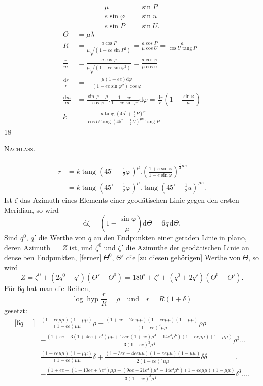 \[
\begin{aligned}
\mu&=\sin P\\
e\sin\varphi&=\sin u\\
e\sin P&=\sin U.
\end{aligned}
\]
\[
\begin{aligned}
\Theta&=\mu\lambda\\[4pt]
R&=\frac{a\cos P}{\mu\sqrt{(1-ee\sin P^2)}}=\frac{a\cos P}{\mu\cos U}=\frac{a}{\cos U\operatorname{tang}P}\\[5pt]
\frac rm&=\frac{a\cos\varphi}{\mu\sqrt{(1-ee\sin\varphi^2)}}=\frac{a\cos\varphi}{\mu\cos u}\\[5pt]
\frac{\mathrm dr}{r}&=-\frac{\mu(1-ee)\mathrm d\varphi}{(1-ee\sin\varphi^2)\cos\varphi}\\[5pt]
\frac{\mathrm dm}{m}&=\frac{\sin\varphi-\mu}{\cos\varphi}.\frac{1-ee}{1-ee\sin\varphi^2}\mathrm d\varphi=\frac{\mathrm dr}{r}\left(1-\frac{\sin\varphi}{\mu}\right)\\[5pt]
k&=\frac{a\operatorname{tang}(45^\circ+\frac12P)^\mu}{\cos U\operatorname{tang}(45^\circ+\frac12U)^{\mu e}\operatorname{tang}P}
\end{aligned}
\]
\vfill{}\hfill18\hspace*{2cm}\par
\clearpage
{}\hfill\textsc{Nachlass.}\hfill\mbox{}\par\medskip
\[
\begin{aligned}
r&=k\operatorname{tang}(45^\circ-\tfrac12\varphi)^\mu.\left(\frac{1+e\sin\varphi}{1-e\sin\varphi}\right)^{\frac12\mu e}\\
&=k\operatorname{tang}(45^\circ-\tfrac12\varphi)^\mu.\operatorname{tang}(45^\circ+\tfrac12u)^{\mu e}.
\end{aligned}
\]
Ist $\zeta$ das Azimuth eines Elements einer geodätischen Linie gegen den ersten Meridian, so wird
\[
\mathrm d\zeta=\left(1-\frac{\sin\varphi}{\mu}\right)\mathrm d\Theta=6q\,\mathrm d\Theta.
\]
Sind $q^0$, $q'$ die Werthe von $q$ an den Endpunkten einer geraden Linie in plano, deren Azimuth $=Z$ ist, und $\zeta^0$ und $\zeta'$ die Azimuthe der geodätischen Linie an denselben Endpunkten, [ferner] $\Theta^0$, $\Theta'$ die [zu diesen gehörigen] Werthe von $\Theta$, so wird
\[
Z=\zeta^0+(2q^0+q')(\Theta'-\Theta^0)=180^\circ+\zeta'+(q^0+2q')(\Theta^0-\Theta').
\]
Für $6q$ hat man die Reihen,
\[
\log\operatorname{hyp}\frac rR=\rho\quad\text{und}\quad r=R(1+\delta)
\]
gesetzt:
\begingroup\footnotesize
\[
\begin{aligned}
{[}6q={]}&\frac{(1-ee\mu\mu)(1-\mu\mu)}{(1-ee)\mu\mu}\rho+\frac{(1+ee-2ee\mu\mu)(1-ee\mu\mu)(1-\mu\mu)}{(1-ee)^2\mu\mu}\rho\rho\\
&-\frac{(1+ee-3(1+4ee+e^4)\mu\mu+15ee(1+ee)\mu^4-14e^4\mu^6)(1-ee\mu\mu)(1-\mu\mu)}{3(1-ee)^3\mu^4}\rho^3\ldots\\[5pt]
=&\frac{(1-ee\mu\mu)(1-\mu\mu)}{(1-ee)\mu\mu}\delta+\frac{(1+3ee-4ee\mu\mu)(1-ee\mu\mu)(1-\mu\mu)}{2(1-ee)^2\mu\mu}\delta\delta\qquad\qquad .\\
&-\frac{(1+ee-(1+10ee+7e^4)\mu\mu+(9ee+21e^4)\mu^4-14e^4\mu^6)(1-ee\mu\mu)(1-\mu\mu)}{3(1-ee)^3\mu^4}\delta^3\ldots.
\end{aligned}
\]
